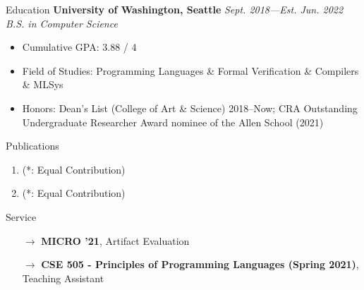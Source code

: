 \documentclass{resume}
\begin{document}
	\begin{rSection}{Education}
	{\bf University of Washington, Seattle} \hfill {\em Sept. 2018---Est. Jun. 2022} \\
	\textit{B.S. in Computer Science}
	\vspace{-5pt}
        \begin{itemize}[leftmargin=*]
            \setlength{\itemsep}{1pt}
            \setlength{\parskip}{0pt}
			\setlength{\parsep}{0pt}
			\item Cumulative GPA: 3.88 / 4
            \item Field of Studies: Programming Languages \& Formal Verification \& Compilers \& MLSys
            \item Honors: Dean's List (College of Art \& Science) 2018--Now; CRA Outstanding Undergraduate Researcher Award nominee of the Allen School (2021)
		\end{itemize}
	\end{rSection}
	\vspace{-5pt}
    \begin{rSection}{Publications}
		\begin{enumerate}
			\setlength{\itemsep}{1pt}
            \setlength{\parskip}{0pt}
			\setlength{\parsep}{0pt}
			\item {} (\small{*: Equal Contribution})
			\item {} (\small{*: Equal Contribution})
		\end{enumerate}
        \vspace{-5pt}
	\end{rSection}
    \vspace{-5pt}
    \begin{rSection}{Service}
    	\begin{enumerate}
    		\setlength{\itemsep}{1pt}
            \setlength{\parskip}{0pt}
    		\setlength{\parsep}{0pt}
    		\item[$\rightarrow$] \textbf{MICRO '21}, Artifact Evaluation
    		\item[$\rightarrow$] \textbf{CSE 505 - Principles of Programming Languages (Spring 2021)}, Teaching Assistant
    	\end{enumerate}
	\end{rSection}
    \vspace{-5pt}
\end{document}
